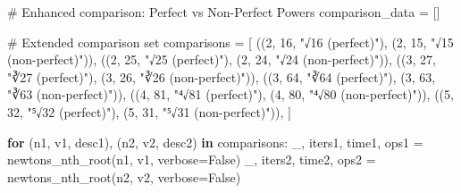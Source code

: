 \documentclass[
  letterpaper,
  DIV=11,
  numbers=noendperiod]{scrartcl}
\newenvironment{Shaded}{\begin{snugshade}}{\end{snugshade}}
\newcommand{\CommentTok}[1]{\textcolor[rgb]{0.37,0.37,0.37}{#1}}
\newcommand{\ControlFlowTok}[1]{\textcolor[rgb]{0.00,0.23,0.31}{\textbf{#1}}}
\newcommand{\DecValTok}[1]{\textcolor[rgb]{0.68,0.00,0.00}{#1}}
\newcommand{\KeywordTok}[1]{\textcolor[rgb]{0.00,0.23,0.31}{\textbf{#1}}}
\newcommand{\NormalTok}[1]{\textcolor[rgb]{0.00,0.23,0.31}{#1}}
\newcommand{\OperatorTok}[1]{\textcolor[rgb]{0.37,0.37,0.37}{#1}}
\newcommand{\StringTok}[1]{\textcolor[rgb]{0.13,0.47,0.30}{#1}}
\newcommand{\VariableTok}[1]{\textcolor[rgb]{0.07,0.07,0.07}{#1}}
\begin{document}
\begin{Shaded}
\begin{Highlighting}[]
\CommentTok{\# Enhanced comparison: Perfect vs Non{-}Perfect Powers}
\NormalTok{comparison\_data }\OperatorTok{=}\NormalTok{ []}

\CommentTok{\# Extended comparison set}
\NormalTok{comparisons }\OperatorTok{=}\NormalTok{ [}
\NormalTok{    ((}\DecValTok{2}\NormalTok{, }\DecValTok{16}\NormalTok{, }\StringTok{"√16 (perfect)"}\NormalTok{), (}\DecValTok{2}\NormalTok{, }\DecValTok{15}\NormalTok{, }\StringTok{"√15 (non{-}perfect)"}\NormalTok{)),}
\NormalTok{    ((}\DecValTok{2}\NormalTok{, }\DecValTok{25}\NormalTok{, }\StringTok{"√25 (perfect)"}\NormalTok{), (}\DecValTok{2}\NormalTok{, }\DecValTok{24}\NormalTok{, }\StringTok{"√24 (non{-}perfect)"}\NormalTok{)),}
\NormalTok{    ((}\DecValTok{3}\NormalTok{, }\DecValTok{27}\NormalTok{, }\StringTok{"∛27 (perfect)"}\NormalTok{), (}\DecValTok{3}\NormalTok{, }\DecValTok{26}\NormalTok{, }\StringTok{"∛26 (non{-}perfect)"}\NormalTok{)),}
\NormalTok{    ((}\DecValTok{3}\NormalTok{, }\DecValTok{64}\NormalTok{, }\StringTok{"∛64 (perfect)"}\NormalTok{), (}\DecValTok{3}\NormalTok{, }\DecValTok{63}\NormalTok{, }\StringTok{"∛63 (non{-}perfect)"}\NormalTok{)),}
\NormalTok{    ((}\DecValTok{4}\NormalTok{, }\DecValTok{81}\NormalTok{, }\StringTok{"⁴√81 (perfect)"}\NormalTok{), (}\DecValTok{4}\NormalTok{, }\DecValTok{80}\NormalTok{, }\StringTok{"⁴√80 (non{-}perfect)"}\NormalTok{)),}
\NormalTok{    ((}\DecValTok{5}\NormalTok{, }\DecValTok{32}\NormalTok{, }\StringTok{"⁵√32 (perfect)"}\NormalTok{), (}\DecValTok{5}\NormalTok{, }\DecValTok{31}\NormalTok{, }\StringTok{"⁵√31 (non{-}perfect)"}\NormalTok{)),}
\NormalTok{]}

\ControlFlowTok{for}\NormalTok{ (n1, v1, desc1), (n2, v2, desc2) }\KeywordTok{in}\NormalTok{ comparisons:}
\NormalTok{    \_, iters1, time1, ops1 }\OperatorTok{=}\NormalTok{ newtons\_nth\_root(n1, v1, verbose}\OperatorTok{=}\VariableTok{False}\NormalTok{)}
\NormalTok{    \_, iters2, time2, ops2 }\OperatorTok{=}\NormalTok{ newtons\_nth\_root(n2, v2, verbose}\OperatorTok{=}\VariableTok{False}\NormalTok{)}
    

\end{Highlighting}
\end{Shaded}
\end{document}
